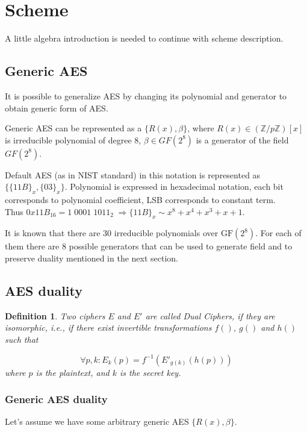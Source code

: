 \documentclass[11pt,oneside,final]{fithesis2}
\newtheorem{mydef}{Definition}
\begin{document}
    \section{Scheme}
    A little algebra introduction is needed to continue with scheme description.

	\subsection{Generic AES}
	It is possible to generalize AES by changing its polynomial and generator to obtain generic form of AES.

	Generic AES can be represented as a $\{R(x), \beta \}$, where $R(x) \in \left(\mathbb{Z}/p\mathbb{Z}\right)[x]$ is 
	irreducible polynomial of degree 8, $\beta \in GF(2^8)$ is a generator of the field $GF(2^8)$.

	Default AES (as in NIST standard) in this notation is represented as $\{\{11B\}_x, \{03\}_x\}$. Polynomial is expressed
	in hexadecimal notation, each bit corresponds to polynomial coefficient, LSB corresponds to constant term.\\
	Thus $0x11B_{16} = 1 \; 0001 \; 1011_{2} \; \Rightarrow \{11B\}_x \sim x^8+x^4+x^3+x+1$.

	It is known that there are $30$ irreducible polynomials over $\text{GF}(2^8)$. For each of them there are $8$ possible
	generators that can be used to generate field and to preserve duality mentioned in the next section.

	\subsection{AES duality}

	\begin{mydef}
	Two ciphers $E$ and $E'$ are called Dual Ciphers, if they are
	isomorphic, i.e., if there exist invertible transformations $f()$, $g()$ and $h()$ such
	that

	\begin{equation} 
	\forall p, k: E_k(p) = f^{-1}\left(E'_{g(k)}(h(p))\right)
	\end{equation}
	where $p$ is the plaintext, and $k$ is the secret key.
	\end{mydef}

	\subsubsection*{Generic AES duality}
	Let's assume we have some arbitrary generic AES $\{R(x), \beta \}$. 
\end{document}
